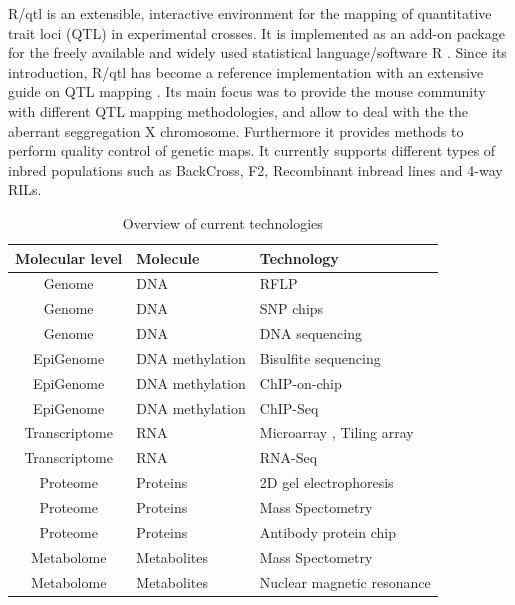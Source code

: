 R/qtl is an extensible, interactive environment for the mapping of quantitative trait loci (QTL) 
in experimental crosses. It is implemented as an add-on package for the freely available and 
widely used statistical language/software R \cite{R:2009}. Since its introduction, R/qtl 
\cite{Broman:2003} has become a reference implementation with an extensive guide on QTL mapping 
\cite{RQTLGuide:2009}. Its main focus was to provide the mouse community with different QTL 
mapping methodologies, and allow to deal with the the aberrant seggregation X chromosome. 
Furthermore it provides methods to perform quality control of genetic maps. It currently 
supports different types of inbred populations such as BackCross, F2, Recombinant inbread 
lines and 4-way RILs. \cite{Broman:2003}

\begin{table}[h]
  \centering
  {\footnotesize
  \begin{tabular}{ | c | l | l | }
    \hline
    {\bf Molecular level} & {\bf Molecule} & {\bf Technology}\\
    \hline
    \hline
\rowcolor{gray!35}    Genome          & DNA                & RFLP \cite{Lander:1986} \\
\rowcolor{gray!35}    Genome          & DNA                & SNP chips \cite{Hacia:1999} \\
\rowcolor{gray!35}    Genome          & DNA                & DNA sequencing \cite{Mardis:2008} \\
    \hline
    EpiGenome       & DNA methylation    & Bisulfite sequencing \cite{Hayatsu:2007} \\
    EpiGenome       & DNA methylation    & ChIP-on-chip \cite{Collas:2010} \\
    EpiGenome       & DNA methylation    & ChIP-Seq \cite{Park:2009} \\
    \hline
    \hline
\rowcolor{gray!35}    Transcriptome   & RNA          & Microarray \cite{Lashkari:1997}, Tiling array \cite{Lee:2013} \\
\rowcolor{gray!35}    Transcriptome   & RNA          & RNA-Seq \cite{Wang:2009}\\
    \hline
    Proteome        & Proteins     & 2D gel electrophoresis \cite{O'Farrell:1975}\\
    Proteome        & Proteins     & Mass Spectometry \cite{Deshaies:2001}\\
    Proteome        & Proteins     & Antibody protein chip \cite{Fasolo:2009} \\
    \hline
\rowcolor{gray!35}    Metabolome      & Metabolites  & Mass Spectometry \cite{Aebersold:2003} \\
\rowcolor{gray!35}    Metabolome      & Metabolites  & Nuclear magnetic resonance \cite{Espina:2009} \\
    \hline
  \end{tabular}
  }
  \caption{Overview of current technologies}
\end{table}

